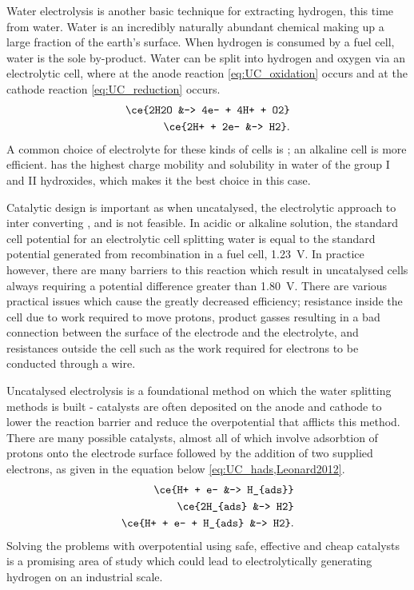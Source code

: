 Water electrolysis is another basic technique for extracting hydrogen, this time from water.
Water is an incredibly naturally abundant chemical making up a large fraction of the earth's surface.
When hydrogen is consumed by a fuel cell, water is the sole by-product.
Water can be split into hydrogen and oxygen via an electrolytic cell, where at the anode reaction \eqref{eq:UC_oxidation} occurs and at the cathode reaction \eqref{eq:UC_reduction} occurs.
\begin{align}
	\ce{2H2O &-> 4e- + 4H+ + O2} \label{eq:UC_oxidation} \\
	\ce{2H+ + 2e- &-> H2} \label{eq:UC_reduction}
.\end{align}
A common choice of electrolyte for these kinds of cells is ; an alkaline cell is more efficient\cite{merrill2006}.
 has the highest charge mobility and solubility in water of the group I and II hydroxides, which makes it the best choice in this case.

Catalytic design is important as when uncatalysed, the electrolytic approach to inter converting  ,  and   is not feasible.
In acidic or alkaline solution, the standard cell potential for an electrolytic cell splitting water is equal to the standard potential generated from recombination in a fuel cell, \SI{1.23}{\volt}\cite{Peng2020}.
In practice however, there are many barriers to this reaction which result in uncatalysed cells always requiring a potential difference greater than \SI{1.80}{\volt}.
There are various practical issues which cause the greatly decreased efficiency; resistance inside the cell due to work required to move protons, product gasses resulting in a bad connection between the surface of the electrode and the electrolyte, and resistances outside the cell such as the work required for electrons to be conducted through a wire.

Uncatalysed electrolysis is a foundational method on which the water splitting methods is built - catalysts are often deposited on the anode and cathode to lower the reaction barrier and reduce the overpotential that afflicts this method.
There are many possible catalysts, almost all of which involve adsorbtion of protons onto the electrode surface followed by the addition of two supplied electrons, as given in the equation below \eqref{eq:UC_hads,Leonard2012}.
\begin{align}
	\ce{H+ + e- &-> H_{ads}}\\
	\ce{2H_{ads} &-> H2}\\
	\ce{H+ + e- + H_{ads} &-> H2} \label{eq:UC_hads}
.\end{align}
Solving the problems with overpotential using safe, effective and cheap catalysts is a promising area of study which could lead to electrolytically generating hydrogen on an industrial scale.



